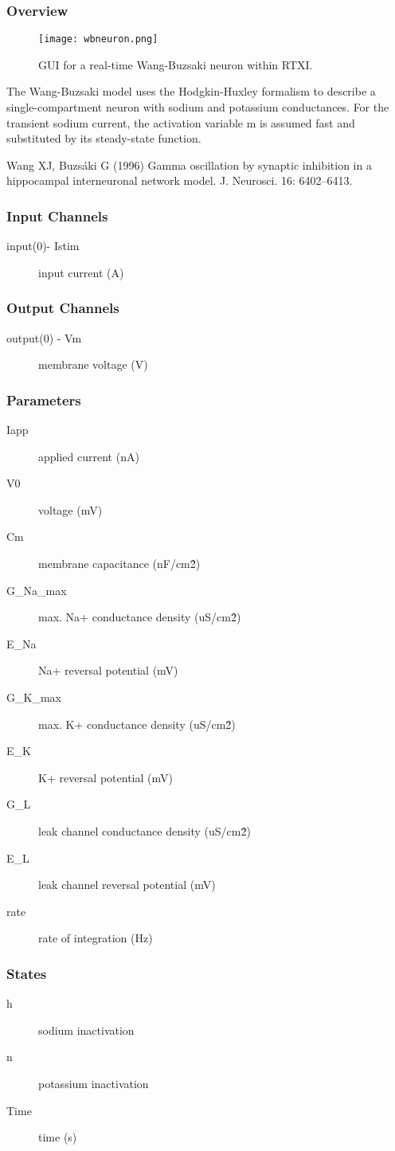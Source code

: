 \subsubsection{Overview}
\label{Wang-Buzsaki Neuron}
\begin{figure}[h]
\begin{center}
\texttt{[image: wbneuron.png]} 
\caption[WB Neuron]{GUI for a real-time Wang-Buzsaki neuron within RTXI.} 
\end{center}
\label{wbneuron}
\end{figure}

The Wang-Buzsaki model uses the Hodgkin-Huxley formalism to describe a single-compartment neuron with sodium and potassium conductances. For the transient sodium current, the activation variable m is assumed fast and substituted by its steady-state function.

Wang XJ, Buzsáki G (1996) Gamma oscillation by synaptic inhibition in a hippocampal interneuronal network model. J. Neurosci. 16: 6402–6413.

\subsubsection{Input Channels}
\begin{description}
\item[input(0)- Istim] input current (A)
\end{description}

\subsubsection{Output Channels}
\begin{description}
\item[output(0) - Vm] membrane voltage (V)
\end{description}

\subsubsection{Parameters}
\begin{description}
\item[Iapp] applied current (nA)
\item[V0] voltage (mV)
\item[Cm] membrane capacitance (nF/cm\^2)
\item[G\_Na\_max] max. Na+ conductance density  (uS/cm\^2)
\item[E\_Na] Na+ reversal potential (mV)
\item[G\_K\_max] max. K+ conductance density (uS/cm\^2)
\item[E\_K] K+ reversal potential (mV)
\item[G\_L] leak channel conductance density (uS/cm\^2)
\item[E\_L] leak channel reversal potential (mV)
\item[rate] rate of integration (Hz)
\end{description}

\subsubsection{States}
\begin{description}
\item[h] sodium inactivation
\item[n] potassium inactivation
\item[Time] time (s)
\end{description}